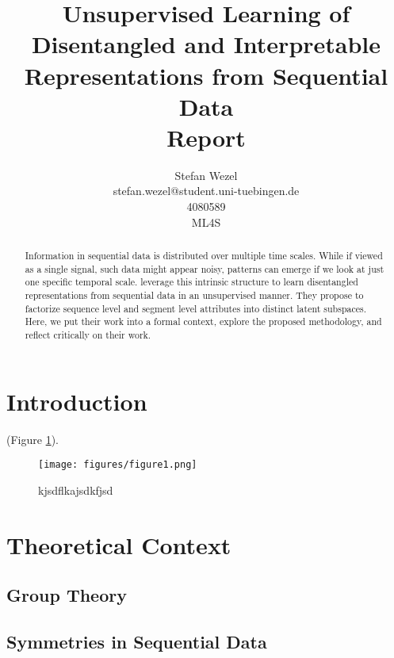 \documentclass{article} %
\title{Unsupervised Learning of Disentangled and Interpretable Representations from Sequential Data\\ \vspace{0.5cm}\large{Report}}
\author{Stefan Wezel \\ stefan.wezel@student.uni-tuebingen.de \\4080589  \\ ML4S}
\begin{document}
\maketitle

\begin{abstract}

%



Information in sequential data is distributed over multiple time scales.
While if viewed as a single signal, such data might appear noisy, patterns can emerge if we look at just one specific temporal scale.
\citet{hsu2017unsupervised} leverage this intrinsic structure to learn disentangled representations from sequential data in an unsupervised manner. They propose to factorize sequence level and segment level attributes into distinct latent subspaces.
Here, we put their work into a formal context, explore the proposed methodology, and reflect critically on their work.
\end{abstract}

\section*{Introduction}
\lipsum[2-3] (Figure \ref{fig:figure_01}).

\begin{figure}
    \texttt{[image: figures/figure1.png]}
    \caption{kjsdflkajsdkfjsd}
    \label{fig:figure_01}
\end{figure}

\section*{Theoretical Context}
\lipsum[4-6]\cite{Papamakarios2016, Ardizzone2019}

\subsection*{Group Theory}


\subsection*{Symmetries in Sequential Data}
\end{document}

